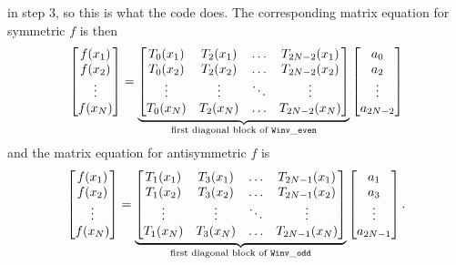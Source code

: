 in step 3, so this is what the code does. The corresponding matrix equation for symmetric
$f$ is then
\begin{align*}
 \begin{bmatrix} 
  f(x_1) \\ f(x_2) \\ \vdots \\ f(x_N)
 \end{bmatrix}
 = 
 \underbrace{
 \begin{bmatrix}
  T_0(x_1) & T_2(x_1) & \hdots & T_{2N-2}(x_1) \\ 
  T_0(x_2) & T_2(x_2) & \hdots & T_{2N-2}(x_2) \\ 
  \vdots   & \vdots   & \ddots & \vdots        \\ 
  T_0(x_N) & T_2(x_N) & \hdots & T_{2N-2}(x_N)
 \end{bmatrix}
 }_{\text{first diagonal block of }{\tt Winv\_even}}
 \begin{bmatrix}
  a_0 \\ a_2 \\ \vdots \\ a_{2N-2}
 \end{bmatrix}
\end{align*}
and the matrix equation for antisymmetric $f$ is
\begin{align*}
 \begin{bmatrix} 
  f(x_1) \\ f(x_2) \\ \vdots \\ f(x_N)
 \end{bmatrix}
 = 
 \underbrace{
 \begin{bmatrix}
  T_1(x_1) & T_3(x_1) & \hdots & T_{2N-1}(x_1) \\ 
  T_1(x_2) & T_3(x_2) & \hdots & T_{2N-1}(x_2) \\ 
  \vdots   & \vdots   & \ddots & \vdots        \\ 
  T_1(x_N) & T_3(x_N) & \hdots & T_{2N-1}(x_N)
 \end{bmatrix}
 }_{\text{first diagonal block of }{\tt Winv\_odd}}
 \begin{bmatrix}
  a_1 \\ a_3 \\ \vdots \\ a_{2N-1}
 \end{bmatrix}.
\end{align*}
